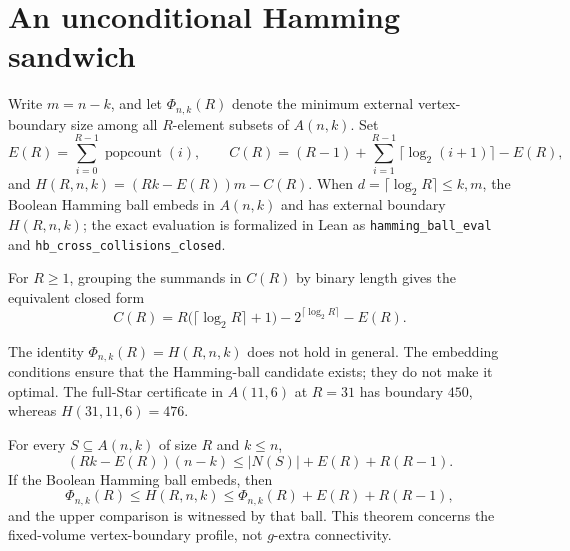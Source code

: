 \section{An unconditional Hamming sandwich}\label{sec:hamming-sandwich}

Write $m=n-k$, and let $\Phi_{n,k}(R)$ denote the minimum external
vertex-boundary size among all $R$-element subsets of $A(n,k)$. Set
\[
 E(R)=\sum_{i=0}^{R-1}\operatorname{popcount}(i),\qquad
 C(R)=(R-1)+\sum_{i=1}^{R-1}\lceil\log_2(i+1)\rceil-E(R),
\]
and $H(R,n,k)=(Rk-E(R))m-C(R)$. When
$d=\lceil\log_2 R\rceil\leq k,m$, the Boolean Hamming ball embeds in
$A(n,k)$ and has external boundary $H(R,n,k)$; the exact evaluation is
formalized in Lean as \texttt{hamming\_ball\_eval} and
\texttt{hb\_cross\_collisions\_closed}.

For $R\geq1$, grouping the summands in $C(R)$ by binary length gives the
equivalent closed form
\begin{equation}\label{eq:cconst}
 C(R)=R\bigl(\lceil\log_2 R\rceil+1\bigr)
      -2^{\lceil\log_2 R\rceil}-E(R).
\end{equation}

The identity $\Phi_{n,k}(R)=H(R,n,k)$ does not hold in general. The embedding
conditions ensure that the Hamming-ball candidate exists; they do not make it
optimal. The full-Star certificate in
$A(11,6)$ at $R=31$ has boundary $450$, whereas $H(31,11,6)=476$.

\begin{theorem}\label{thm:hamming-sandwich}
For every $S\subseteq A(n,k)$ of size $R$ and $k\leq n$,
\begin{equation}\label{eq:hamming-linear-lower}
 (Rk-E(R))(n-k)\leq |N(S)|+E(R)+R(R-1).
\end{equation}
If the Boolean Hamming ball embeds, then
\begin{equation}\label{eq:hamming-profile-sandwich}
 \Phi_{n,k}(R)\leq H(R,n,k)
 \leq \Phi_{n,k}(R)+E(R)+R(R-1),
\end{equation}
and the upper comparison is witnessed by that ball. This theorem concerns
the fixed-volume vertex-boundary profile, not $g$-extra connectivity.
\end{theorem}

